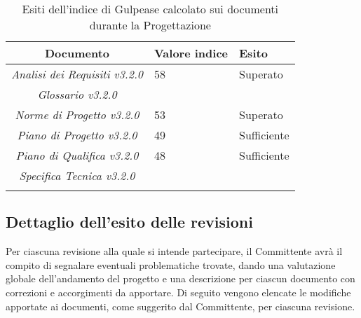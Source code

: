 \begin{longtable}{|c|p{3cm}|p{3cm}|}
\toprule
\textbf{Documento} & \textbf{Valore indice} & \textbf{Esito} \\


\midrule
\midrule
\emph{Analisi dei Requisiti v3.2.0} & 58 & Superato \\
\midrule
\emph{Glossario v3.2.0} &  &\\
\midrule
\emph{Norme di Progetto v3.2.0} & 53  & Superato\\
\midrule
\emph{Piano di Progetto v3.2.0} & 49  & Sufficiente\\
\midrule
\emph{Piano di Qualifica v3.2.0} & 48  & Sufficiente\\
\midrule
\emph{Specifica Tecnica v3.2.0} &  & \\
\bottomrule
\caption{Esiti dell'indice di Gulpease calcolato sui documenti durante la Progettazione}
\label{tab:changelog}
\end{longtable}

\subsection{Dettaglio dell'esito delle revisioni}
Per ciascuna revisione alla quale si intende partecipare, il Committente avrà il compito di segnalare eventuali problematiche trovate, dando una valutazione globale dell'andamento del progetto e una descrizione per ciascun documento con correzioni e accorgimenti da apportare.
Di seguito vengono elencate le modifiche apportate ai documenti, come suggerito dal Committente, per ciascuna revisione.
